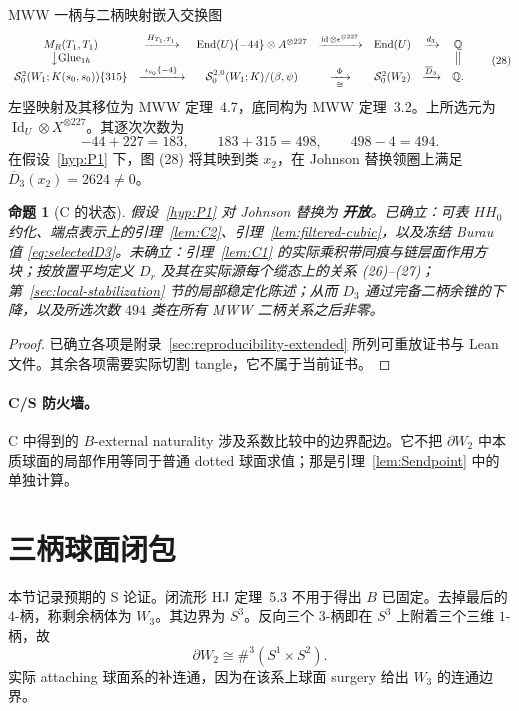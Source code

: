\documentclass[11pt]{amsart}
\newtheorem{proposition}[theorem]{命题}
\theoremstyle{definition}
\theoremstyle{remark}
\newcommand{\Q}{\mathbb{Q}}
\newcommand{\Open}{\textbf{开放}}
\begin{document}
MWW 一柄与二柄映射嵌入交换图
\[
\begin{array}{ccccccc}
M_R(T_1,T_1)&\xrightarrow{H_{T_1,T_1}}&
\operatorname{End}(U)\{-44\}\otimes A^{\otimes227}
&\xrightarrow{\operatorname{id}\otimes\epsilon^{\otimes227}}&
\operatorname{End}(U)&\xrightarrow{d_3}&\Q\\
\big\downarrow{\mathrm{Glue}_{1h}}&&&&&&\big\Vert\\
\mathcal S^2_0(W_1;K(s_0,s_0))\{315\}
&\xrightarrow{\ \iota_{s_0}\{-4\}\ }&
\mathcal S^{2,0}_0(W_1;K)/(\beta,\psi)
&\xrightarrow[\cong]{\ \Phi\ }&\mathcal S^2_0(W_2)
&\xrightarrow{\overline D_3}&\Q.
\end{array}
\tag{28}
\]
左竖映射及其移位为 MWW 定理~4.7，底同构为 MWW 定理~3.2。上所选元为 $\operatorname{Id}_U\otimes X^{\otimes227}$。其逐次次数为
\[
-44+227=183,\qquad183+315=498,\qquad498-4=494.
\]
在假设~\ref{hyp:P1} 下，图 (28) 将其映到类 $x_2$，在 Johnson 替换领圈上满足 $\overline D_3(x_2)=2624\ne0$。

\begin{proposition}[C 的状态]\label{thm:Cdischarge}
假设~\ref{hyp:P1} 对 Johnson 替换为 \Open。已确立：可表 $HH_0$ 约化、端点表示上的引理~\ref{lem:C2}、引理~\ref{lem:filtered-cubic}，以及冻结 Burau 值 \eqref{eq:selectedD3}。未确立：引理~\ref{lem:C1} 的实际乘积带同痕与链层面作用方块；按放置平均定义 $D_r$ 及其在实际源每个缆态上的关系 (26)--(27)；第~\ref{sec:local-stabilization} 节的局部稳定化陈述；从而 $D_3$ 通过完备二柄余锥的下降，以及所选次数 $494$ 类在所有 MWW 二柄关系之后非零。
\end{proposition}

\begin{proof}
已确立各项是附录~\ref{sec:reproducibility-extended} 所列可重放证书与 Lean 文件。其余各项需要实际切割 tangle，它不属于当前证书。
\end{proof}

\paragraph{C/S 防火墙。}
C 中得到的 $B$-external naturality 涉及系数比较中的边界配边。它不把 $\partial W_2$ 中本质球面的局部作用等同于普通 dotted 球面求值；那是引理~\ref{lem:Sendpoint} 中的单独计算。
\section{三柄球面闭包}\label{sec:s-closure}

本节记录预期的 S 论证。闭流形 HJ 定理~5.3 不用于得出 $B$ 已固定。去掉最后的 $4$-柄，称剩余柄体为 $W_3$。其边界为 $S^3$。反向三个 $3$-柄即在 $S^3$ 上附着三个三维 $1$-柄，故
\[
\partial W_2\cong\#^3(S^1\times S^2).
\]
实际 attaching 球面系的补连通，因为在该系上球面 surgery 给出 $W_3$ 的连通边界。
\end{document}
